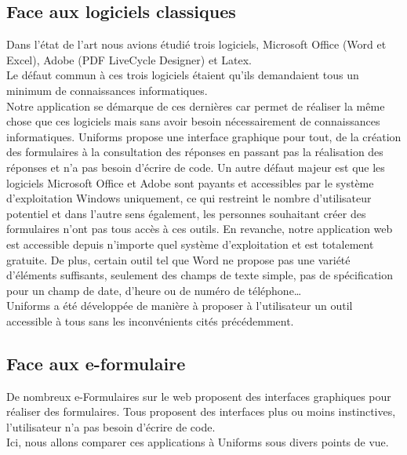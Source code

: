 \documentclass{sigplanconf}
\begin{document}
\subsection{Face aux logiciels classiques}
Dans l’état de l’art nous avions étudié trois logiciels,  Microsoft Office (Word et Excel), Adobe (PDF LiveCycle Designer) et Latex.\\
Le défaut commun à ces trois logiciels étaient qu’ils demandaient tous un minimum de connaissances informatiques.\\
Notre application se démarque de ces dernières car permet de réaliser la même chose que ces logiciels mais sans avoir besoin nécessairement de connaissances informatiques. Uniforms propose une interface graphique pour tout, de la création des formulaires à la consultation des réponses en passant pas la réalisation des réponses et n’a pas besoin d’écrire de code.
Un autre défaut majeur est que les logiciels Microsoft Office et Adobe sont payants et accessibles par le système d’exploitation Windows uniquement, ce qui restreint le nombre d’utilisateur potentiel et dans l’autre sens également, les personnes souhaitant créer des formulaires n’ont pas tous accès à ces outils. En revanche, notre application web est accessible depuis n’importe quel système d’exploitation et est totalement gratuite.
De plus, certain outil tel que Word ne propose pas une variété d’éléments suffisants, seulement des champs de texte simple, pas de spécification pour un champ de date, d’heure ou de numéro de téléphone…\\
Uniforms a été développée de manière à proposer à l’utilisateur un outil accessible à tous sans les inconvénients cités précédemment.

\subsection{Face aux e-formulaire}
De nombreux e-Formulaires sur le web proposent des interfaces graphiques pour réaliser des formulaires. Tous proposent des interfaces plus ou moins instinctives, l’utilisateur n’a pas besoin d’écrire de code. \\
Ici, nous allons comparer ces applications à Uniforms sous divers points de vue.
\end{document}
